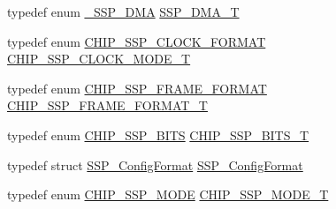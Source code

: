 \begin{DoxyCompactItemize}
\item 
typedef enum \hyperlink{group___s_s_p__18_x_x__43_x_x_gaee679ef8477b8e31bf174e66e2984caf}{\+\_\+\+S\+S\+P\+\_\+\+D\+MA} \hyperlink{group___s_s_p__18_x_x__43_x_x_ga026212e0116f9a1109fd221e6b0ac503}{S\+S\+P\+\_\+\+D\+M\+A\+\_\+T}
\item 
typedef enum \hyperlink{group___s_s_p__18_x_x__43_x_x_gab423240914ad746147aeb31f483e9553}{C\+H\+I\+P\+\_\+\+S\+S\+P\+\_\+\+C\+L\+O\+C\+K\+\_\+\+F\+O\+R\+M\+AT} \hyperlink{group___s_s_p__18_x_x__43_x_x_ga12dec81e345a9ffbefd6a1fae5759e09}{C\+H\+I\+P\+\_\+\+S\+S\+P\+\_\+\+C\+L\+O\+C\+K\+\_\+\+M\+O\+D\+E\+\_\+T}
\item 
typedef enum \hyperlink{group___s_s_p__18_x_x__43_x_x_gad3ae555ad43caa2b2a47bc4769d8fe50}{C\+H\+I\+P\+\_\+\+S\+S\+P\+\_\+\+F\+R\+A\+M\+E\+\_\+\+F\+O\+R\+M\+AT} \hyperlink{group___s_s_p__18_x_x__43_x_x_ga207687847d9ab8385057ddeca53c2942}{C\+H\+I\+P\+\_\+\+S\+S\+P\+\_\+\+F\+R\+A\+M\+E\+\_\+\+F\+O\+R\+M\+A\+T\+\_\+T}
\item 
typedef enum \hyperlink{group___s_s_p__18_x_x__43_x_x_ga2f99e08511788c146ae9b35023e4a61c}{C\+H\+I\+P\+\_\+\+S\+S\+P\+\_\+\+B\+I\+TS} \hyperlink{group___s_s_p__18_x_x__43_x_x_ga4e348748c4fb42ef94c2cbd968a43648}{C\+H\+I\+P\+\_\+\+S\+S\+P\+\_\+\+B\+I\+T\+S\+\_\+T}
\item 
typedef struct \hyperlink{struct_s_s_p___config_format}{S\+S\+P\+\_\+\+Config\+Format} \hyperlink{group___s_s_p__18_x_x__43_x_x_ga0c59381b3e253fe86244ec98a53a7d79}{S\+S\+P\+\_\+\+Config\+Format}
\item 
typedef enum \hyperlink{group___s_s_p__18_x_x__43_x_x_ga2a375ed10848e3661b9b015fea1cf39b}{C\+H\+I\+P\+\_\+\+S\+S\+P\+\_\+\+M\+O\+DE} \hyperlink{group___s_s_p__18_x_x__43_x_x_gaced971159acfb5b4f06caa5b02f5a680}{C\+H\+I\+P\+\_\+\+S\+S\+P\+\_\+\+M\+O\+D\+E\+\_\+T}
\end{DoxyCompactItemize}
